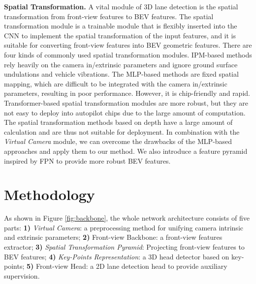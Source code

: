 \documentclass[10pt,twocolumn,letterpaper]{article}
\begin{document}
\textbf{Spatial Transformation.}
A vital module of 3D lane detection is the spatial transformation from front-view features to BEV features. The spatial transformation module\cite{jaderberg2015spatial} is a trainable module that is flexibly inserted into the CNN to implement the spatial transformation of the input features, and it is suitable for converting front-view features into BEV geometric features. There are four kinds of commonly used spatial transformation modules. IPM-based methods \cite{reiher2020sim2real,garnett20193d,guo2020gen} rely heavily on the camera in/extrinsic parameters and ignore ground surface undulations and vehicle vibrations. The MLP-based methods \cite{pan2020cross, li2021hdmapnet} are fixed spatial mapping, which are difficult to be integrated with the camera in/extrinsic parameters, resulting in poor performance. However, it is chip-friendly and rapid. Transformer-based spatial transformation modules\cite{chen2022persformer,li2022bevformer} are more robust, but they are not easy to deploy into autopilot chips due to the large amount of computation. The spatial transformation methods based on depth\cite{philion2020lift,huang2021bevdet} have a large amount of calculation and are thus not suitable for deployment. In combination with the \textit{Virtual Camera} module, we can overcome the drawbacks of the MLP-based approaches and apply them to our method. We also introduce a feature pyramid inspired by FPN\cite{lin2017feature} to provide more robust BEV features.



%
 
\section{Methodology} \label{sec:methodology}
As shown in Figure \ref{fig:backbone}, the whole network architecture consists of five parts: \textbf{1)} \textit{Virtual Camera}: a preprocessing method for unifying camera intrinsic and extrinsic parameters; \textbf{2)} Front-view Backbone: a front-view features extractor; \textbf{3)} \textit{Spatial Transformation Pyramid}: Projecting  front-view features to BEV features; \textbf{4)} \textit{Key-Points Representation}: a 3D head detector based on key-points; \textbf{5)} Front-view Head: a 2D lane detection head to provide auxiliary supervision.
\end{document}
